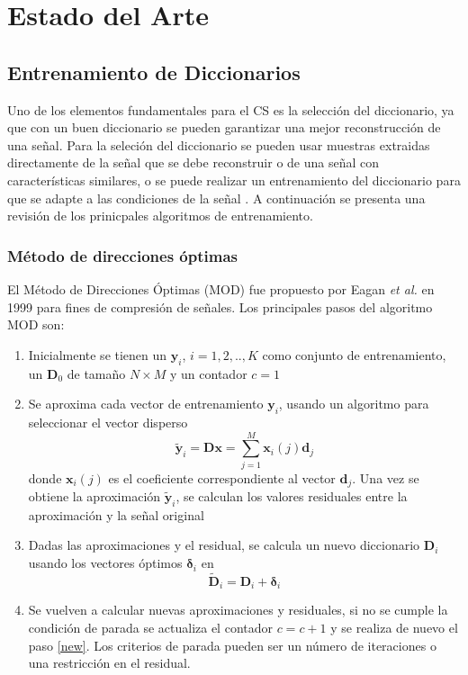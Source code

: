 \chapter{Estado del Arte}
\label{chap:related}

\section{Entrenamiento de Diccionarios}

Uno de los elementos fundamentales para el CS es la selecci\'on del diccionario, ya que con un buen diccionario se pueden garantizar una mejor reconstrucci\'on de una se\~nal. Para la seleci\'on del diccionario se pueden usar muestras extraidas directamente de la se\~nal que se debe reconstruir o de una se\~nal con caracter\'isticas similares, o se puede realizar un entrenamiento del diccionario para que se adapte a las condiciones de la se\~nal \cite{dictionaries}. A continuaci\'on se presenta una revisi\'on de los prinicpales algoritmos de entrenamiento. 

\subsection{M\'etodo de direcciones \'optimas }
El M\'etodo de Direcciones \'Optimas (MOD) fue propuesto por Eagan \textit{et al.} en 1999 \cite{omp} para fines de compresi\'on de se\~nales. Los principales pasos del algoritmo MOD son:
\begin{enumerate}
\item Inicialmente se tienen un $\bm{y}_i$, $i=1,2, .., K$ como conjunto de entrenamiento, un $\bm{D}_0$ de tama\~no $N \times M$ y un contador $c = 1$ 
\item Se aproxima cada vector de entrenamiento $\bm{y}_i$, usando un algoritmo para seleccionar el vector disperso 
\begin{equation}
\bm{\widetilde{y}}_i=\bm{Dx} = \sum \limits_{j=1}^{M} \bm{x}_i(j) \bm{d}_j
\end{equation}
donde $\bm{x}_i(j)$ es el coeficiente correspondiente al vector $\bm{d}_j$. Una vez se obtiene la aproximaci\'on $\bm{\widetilde{y}}_i$, se calculan los valores residuales entre la aproximaci\'on y la se\~nal original
\item \label{new} Dadas las aproximaciones y el residual, se calcula un nuevo diccionario $\bm{D}_i$ usando los vectores \'optimos $\bm{\delta}_i$ en
\begin{equation}
\bm{\widetilde{D}}_i= \bm{D}_i + \bm{\delta}_i
\end{equation}
\item Se vuelven a calcular nuevas aproximaciones y residuales, si no se cumple la condici\'on de parada se actualiza el contador $c = c + 1$ y se realiza de nuevo el paso \ref{new}. Los criterios de parada pueden ser un n\'umero de iteraciones o una restricci\'on en el residual.
\end{enumerate}

